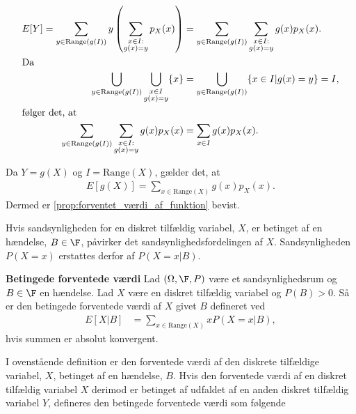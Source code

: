 \begin{bev}
\begin{align}
    E[Y] = \sum_{y \in \text{Range}\left(g(I)\right)} y\left( \sum_{\substack{x \in I:\\ g(x) =y}}p_X(x) \right)
    &=\sum_{y \in \text{Range}\left(g(I)\right)}\sum_{\substack{x \in I:\\ g(x) =y}} g(x) p_X(x). \nonumber\\
    \intertext{Da}
    \bigcup_{y\in \text{Range}\left(g(I)\right)}\bigcup_{\substack{x\in I\\g(x)=y}}\{x\}&=\bigcup_{y\in\text{Range}\left(g(I)\right)}\{x\in I|g(x)=y\} = I,\nonumber\\
    \intertext{følger det, at}
    \sum_{y \in \text{Range}\left(g(I)\right)}\sum_{\substack{x \in I:\\ g(x) =y}} g(x) p_X(x)&=\sum_{x\in I}g(x)p_X(x). \nonumber
\end{align}

Da $Y=g(X)$ og $I = \text{Range}(X)$, gælder det, at
\begin{align*}
    E\left[g(X)\right]=\sum_{x\in \text{Range}(X)}g(x)p_X(x).
\end{align*}
Dermed er \autoref{prop:forventet_værdi_af_funktion} bevist.
\end{bev}

Hvis sandsynligheden for en diskret tilfældig variabel, $X$, er betinget af en hændelse, $B\in\F$, påvirker det sandsynlighedsfordelingen af $X$. Sandsynligheden $P(X=x)$ erstattes derfor af $P(X=x|B)$.

\begin{minipage}\textwidth
\begin{defn}\textbf{Betingede forventede værdi}\label{def:betinget_forventet_værdi} %
\newline
Lad $(\Omega, \F, P)$ være et sandsynlighedsrum og $B\in\F$ en hændelse. Lad $X$ være en diskret tilfældig variabel og $P(B)>0$. Så er den betingede forventede værdi af $X$ givet $B$ defineret ved 
\begin{align*}
    E[X|B]&=\sum_{x\in \text{Range}(X)}xP(X=x|B),
\end{align*}
hvis summen er absolut konvergent.
\end{defn}
\end{minipage}

I ovenstående definition er den forventede værdi af den diskrete tilfældige variabel, $X$, betinget af en hændelse, $B$. Hvis den forventede værdi af en diskret tilfældig variabel $X$ derimod er betinget af udfaldet af en anden diskret tilfældig variabel $Y$, defineres den betingede forventede værdi som følgende

